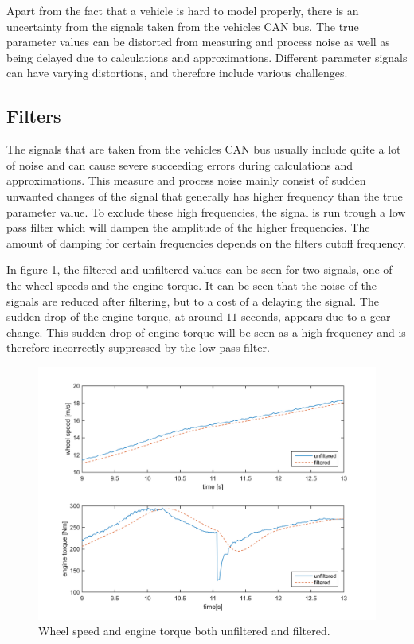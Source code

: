 Apart from the fact that a vehicle is hard to model properly, there is an uncertainty from the signals taken from the vehicles CAN bus. The true parameter values can be distorted from measuring and process noise as well as being delayed due to calculations and approximations. Different parameter signals can have varying distortions, and therefore include various challenges.

\subsection{Filters}

The signals that are taken from the vehicles CAN bus usually include quite a lot of noise and can cause severe succeeding errors during calculations and approximations. This measure and process noise mainly consist of sudden unwanted changes of the signal that generally has higher frequency than the true parameter value. To exclude these high frequencies, the signal is run trough a low pass filter which will dampen the amplitude of the higher frequencies. The amount of damping for certain frequencies depends on the filters cutoff frequency. 

In figure \ref{filter_and_no}, the filtered and unfiltered values can be seen for two signals, one of the wheel speeds and the engine torque. It can be seen that the noise of the signals are reduced after filtering, but to a cost of a delaying the signal. The sudden drop of the engine torque, at around $ 11 $ seconds, appears due to a gear change. This sudden drop of engine torque will be seen as a high frequency and is therefore incorrectly suppressed by the low pass filter.

\begin{figure}[h]
	\centering
	\includegraphics[width=1.0\textwidth]{Pictures/filter_and_no}
	\caption {Wheel speed and engine torque both unfiltered and filtered.}
	\label{filter_and_no}
\end{figure}

